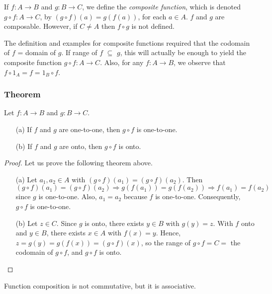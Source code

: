 \documentclass[11pt]{article}
\begin{document}
    If \(f:A \rightarrow B\) and \(g: B \rightarrow C\), we define the \emph{composite function}, which is denoted \(g \circ f: A \rightarrow C\), by \((g \circ f)(a) = g(f(a))\), for each \(a \in A\). $f$ and $g$ are composable. However, if \(C \neq A\) then \(f \circ g\) is not defined.

    \vspace{1em}

    The definition and examples for composite functions required that the codomain of $f$ = domain of $g$. If range of $f$ \(\subseteq\) $g$, this will actually be enough to yield the composite function \(g \circ f: A \rightarrow C\). Also, for any \(f:A \rightarrow B\), we observe that \(f \circ 1_A = f = 1_B \circ f\).

    \subsubsection{Theorem}

    Let \(f:A \rightarrow B\) and \(g:B \rightarrow C\).
    \begin{enumerate}
        \item[(a)] If  $f$ and $g$ are one-to-one, then \(g \circ f\) is one-to-one.
        \item[(b)] If $f$ and $g$ are onto, then \(g \circ f\) is onto.   
    \end{enumerate}

    \begin{proof} Let us prove the following theorem above.
        \begin{enumerate}
            \item[(a)] Let \(a_1, a_2 \in A\) with \((g \circ f)(a_1) = (g \circ f)(a_2)\). Then \[(g \circ f)(a_1) = (g \circ f)(a_2) \Rightarrow g(f(a_1)) = g(f(a_2)) \Rightarrow f(a_1) = f(a_2)\] since $g$ is one-to-one. Also, \(a_1 = a_2\) because $f$ is one-to-one. Consequently, \(g \circ f\) is one-to-one. 
            \item[(b)] Let \(z \in C\). Since $g$ is onto, there exists \(y \in B\) with \(g(y) = z.\) With $f$ onto and \(y \in B\), there exists \(x \in A\) with \(f(x) = y\). Hence, \(z = g(y) = g(f(x)) = (g \circ f)(x)\), so the range of \(g \circ f = C = \) the codomain of \(g \circ f\), and \(g \circ f\) is onto. 
        \end{enumerate}
    \end{proof}

    Function composition is not commutative, but it is associative.
\end{document}
